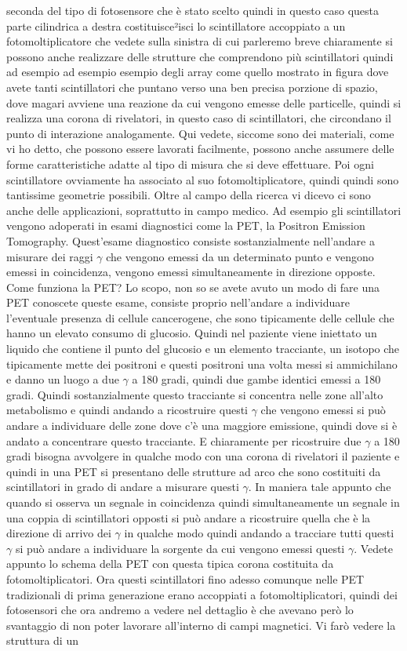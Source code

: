 {seconda del tipo di fotosensore che è stato scelto quindi in questo caso questa parte cilindrica a destra costituisce²isci lo scintillatore accoppiato a un fotomoltiplicatore che vedete sulla sinistra di cui parleremo breve chiaramente si possono anche realizzare delle strutture che comprendono più scintillatori quindi ad esempio ad esempio esempio degli array come quello mostrato in figura dove avete tanti scintillatori che puntano verso una ben precisa porzione di spazio, dove magari avviene una reazione da cui vengono emesse delle particelle, quindi si realizza una corona di rivelatori, in questo caso di scintillatori, che circondano il punto di interazione analogamente. Qui vedete, siccome sono dei materiali, come vi ho detto, che possono essere lavorati facilmente, possono anche assumere delle forme caratteristiche adatte al tipo di misura che si deve effettuare. Poi ogni scintillatore ovviamente ha associato al suo fotomoltiplicatore, quindi quindi sono tantissime geometrie possibili. Oltre al campo della ricerca vi dicevo ci sono anche delle applicazioni, soprattutto in campo medico. Ad esempio gli scintillatori vengono adoperati in esami diagnostici come la PET, la Positron Emission Tomography. Quest'esame diagnostico consiste sostanzialmente nell'andare a misurare dei raggi $\gamma$ che vengono emessi da un determinato punto e vengono emessi in coincidenza, vengono emessi simultaneamente in direzione opposte. Come funziona la PET? Lo scopo, non so se avete avuto un modo di fare una PET conoscete queste esame, consiste proprio nell'andare a individuare l'eventuale presenza di cellule cancerogene, che sono tipicamente delle cellule che hanno un elevato consumo di glucosio. Quindi nel paziente viene iniettato un liquido che contiene il punto del glucosio e un elemento tracciante, un isotopo che tipicamente mette dei positroni e questi positroni una volta messi si ammichilano e danno un luogo a due $\gamma$ a 180 gradi, quindi due gambe identici emessi a 180 gradi. Quindi sostanzialmente questo tracciante si concentra nelle zone all'alto metabolismo e quindi andando a ricostruire questi $\gamma$ che vengono emessi si può andare a individuare delle zone dove c'è una maggiore emissione, quindi dove si è andato a concentrare questo tracciante. E chiaramente per ricostruire due $\gamma$ a 180 gradi bisogna avvolgere in qualche modo con una corona di rivelatori il paziente e quindi in una PET si presentano delle strutture ad arco che sono costituiti da scintillatori in grado di andare a misurare questi $\gamma$. In maniera tale appunto che quando si osserva un segnale in coincidenza quindi simultaneamente un segnale in una coppia di scintillatori opposti si può andare a ricostruire quella che è la direzione di arrivo dei $\gamma$ in qualche modo quindi andando a tracciare tutti questi $\gamma$ si può andare a individuare la sorgente da cui vengono emessi questi $\gamma$. Vedete appunto lo schema della PET con questa tipica corona costituita da fotomoltiplicatori. Ora questi scintillatori fino adesso comunque nelle PET tradizionali di prima generazione erano accoppiati a fotomoltiplicatori, quindi dei fotosensori che ora andremo a vedere nel dettaglio è che avevano però lo svantaggio di non poter lavorare all'interno di campi magnetici. Vi farò vedere la struttura di un }
